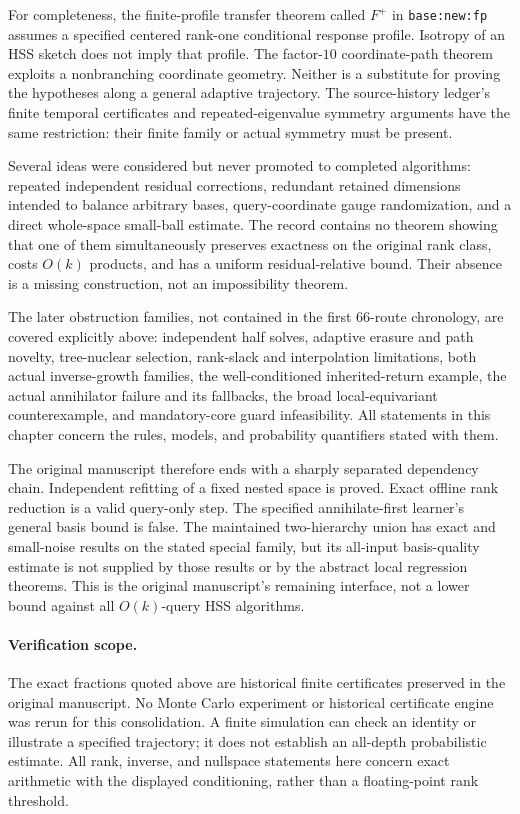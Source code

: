 \documentclass[11pt,oneside,openany,a4paper]{report}
\numberwithin{equation}{chapter}
\theoremstyle{definition}
\theoremstyle{remark}
\begin{document}
For completeness, the finite-profile transfer theorem called
$F^+$ in \texttt{base:new:fp} assumes a specified centered
rank-one conditional response profile.  Isotropy of an HSS sketch
does not imply that profile.  The factor-$10$ coordinate-path
theorem exploits a nonbranching coordinate geometry.  Neither is
a substitute for proving the hypotheses along a general adaptive
trajectory.  The source-history ledger's finite temporal
certificates and repeated-eigenvalue symmetry arguments have the
same restriction: their finite family or actual symmetry must
be present.

Several ideas were considered but never promoted to completed
algorithms: repeated independent residual corrections, redundant
retained dimensions intended to balance arbitrary bases,
query-coordinate gauge randomization, and a direct whole-space
small-ball estimate.  The record contains no theorem showing
that one of them simultaneously preserves exactness on the
original rank class, costs $O(k)$ products, and has a uniform
residual-relative bound.  Their absence is a missing construction,
not an impossibility theorem.

The later obstruction families, not contained in the first
66-route chronology, are covered explicitly above: independent
half solves, adaptive erasure and path novelty, tree-nuclear
selection, rank-slack and interpolation limitations, both actual
inverse-growth families, the well-conditioned inherited-return
example, the actual annihilator failure and its fallbacks,
the broad local-equivariant counterexample, and mandatory-core
guard infeasibility.  All statements in this chapter concern the
rules, models, and probability quantifiers stated with them.

The original manuscript therefore ends with a sharply separated
dependency chain.  Independent refitting of a fixed nested space
is proved.  Exact offline rank reduction is a valid query-only
step.  The specified annihilate-first learner's general basis
bound is false.  The maintained two-hierarchy union has exact and
small-noise results on the stated special family, but its
all-input basis-quality estimate is not supplied by those
results or by the abstract local regression theorems.  This is
the original manuscript's remaining interface, not a lower
bound against all $O(k)$-query HSS algorithms.

\paragraph{Verification scope.}
The exact fractions quoted above are historical finite
certificates preserved in the original manuscript.  No
Monte Carlo experiment or historical certificate engine was
rerun for this consolidation.  A finite simulation can check
an identity or illustrate a specified trajectory; it does not
establish an all-depth probabilistic estimate.  All rank,
inverse, and nullspace statements here concern exact
arithmetic with the displayed conditioning, rather than a
floating-point rank threshold.
\end{document}

